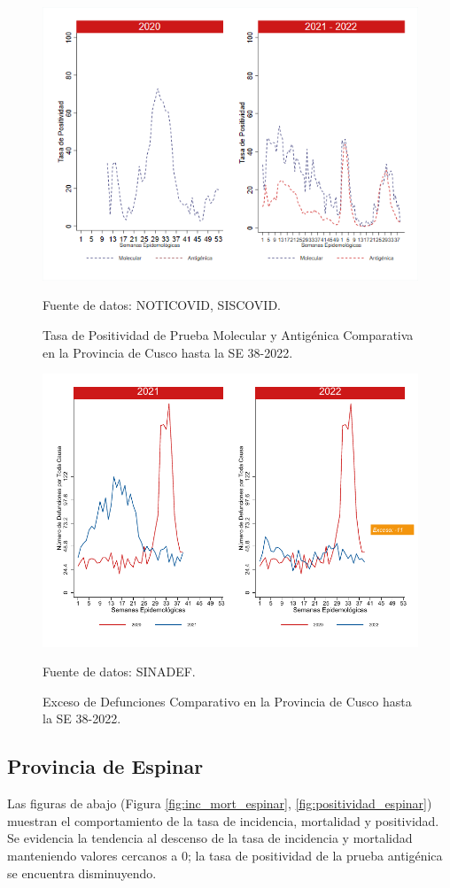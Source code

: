 \documentclass[12pt,a4paper,openany]{book}
\begin{document}
	\begin{figure}[h]
		\caption{Tasa de Positividad de Prueba Molecular y Antigénica Comparativa en la Provincia de Cusco hasta la SE 38-2022.}\label{fig:positividad_cusco}
		\begin{center}
			\includegraphics[width=0.7\linewidth]{../figuras/positividad_20_21_7.png}
		\end{center}
		{\footnotesize {Fuente de datos: NOTICOVID, SISCOVID.}}
	\end{figure}
	
	\begin{figure}[h]
		\caption{Exceso de Defunciones Comparativo en la Provincia de Cusco hasta la SE 38-2022.}\label{fig:exceso_cusco}
		\begin{center}
			\includegraphics[width=0.7\linewidth]{../figuras/exceso_7.pdf}
		\end{center}
		{\footnotesize {Fuente de datos: SINADEF.}}
	\end{figure}
	
	\clearpage
	
	\subsection*{Provincia de Espinar}
	\noindent Las figuras de abajo (Figura \ref{fig:inc_mort_espinar}, \ref{fig:positividad_espinar}) muestran el comportamiento de la tasa de incidencia, mortalidad y positividad. Se evidencia la tendencia al descenso de la tasa de incidencia y mortalidad manteniendo valores cercanos a 0; la tasa de positividad de la prueba antigénica se encuentra disminuyendo.
	
\end{document}

